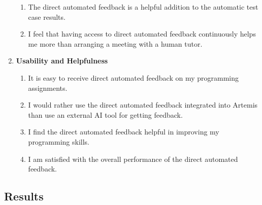 \documentclass[manuscript,screen,review]{acmart}
\begin{document}
\begin{enumerate}[label=\textbf{RQ\arabic*}]
\begin{enumerate}[label=\textbf{Q\arabic*},resume]
      \item The direct automated feedback is a helpful addition to the automatic test case results.
      \item I feel that having access to direct automated feedback continuously helps me more than arranging a meeting with a human tutor.
    \end{enumerate}
  \item \textbf{Usability and Helpfulness}
    \begin{enumerate}[label=\textbf{Q\arabic*},resume]
      \item It is easy to receive direct automated feedback  on my programming assignments.
      \item I would rather use the direct automated feedback integrated into Artemis than use an external AI tool for getting feedback.
      \item I find the direct automated feedback helpful in improving my programming skills.
      \item I am satisfied with the overall performance of the direct automated feedback.
    \end{enumerate}
\end{enumerate}





\subsection{Results}
\end{document}
